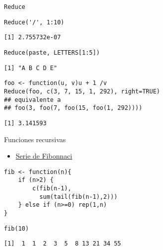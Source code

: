 \documentclass[xcolor={usenames,svgnames,dvipsnames}]{beamer}
\begin{document}
\begin{frame}[fragile,label={sec:orgheadline31}]{\texttt{Reduce}}
 \lstset{language=R,label= ,caption= ,captionpos=b,numbers=none}
\begin{lstlisting}
Reduce('/', 1:10)
\end{lstlisting}

\begin{verbatim}
[1] 2.755732e-07
\end{verbatim}

\lstset{language=R,label= ,caption= ,captionpos=b,numbers=none}
\begin{lstlisting}
Reduce(paste, LETTERS[1:5])
\end{lstlisting}

\begin{verbatim}
[1] "A B C D E"
\end{verbatim}

\lstset{language=R,label= ,caption= ,captionpos=b,numbers=none}
\begin{lstlisting}
foo <- function(u, v)u + 1 /v
Reduce(foo, c(3, 7, 15, 1, 292), right=TRUE)
## equivalente a
## foo(3, foo(7, foo(15, foo(1, 292))))
\end{lstlisting}

\begin{verbatim}
[1] 3.141593
\end{verbatim}
\end{frame}

\begin{frame}[fragile,label={sec:orgheadline32}]{Funciones recursivas}
 \begin{itemize}
\item \href{http://en.wikibooks.org/wiki/R_Programming/Working_with_functions#Functions_as_Objects}{Serie de Fibonnaci}
\end{itemize}
\lstset{language=R,label= ,caption= ,captionpos=b,numbers=none}
\begin{lstlisting}
fib <- function(n){
    if (n>2) {
        c(fib(n-1),
          sum(tail(fib(n-1),2)))
    } else if (n>=0) rep(1,n)
}
\end{lstlisting}

\lstset{language=R,label= ,caption= ,captionpos=b,numbers=none}
\begin{lstlisting}
fib(10)
\end{lstlisting}

\begin{verbatim}
[1]  1  1  2  3  5  8 13 21 34 55
\end{verbatim}
\end{frame}
\end{document}
